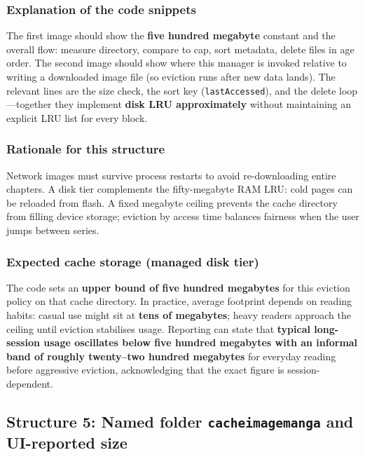 \subsubsection*{Explanation of the code snippets}
The first image should show the \textbf{five hundred megabyte} constant and the overall flow: measure directory, compare to cap, sort metadata, delete files in age order. The second image should show where this manager is invoked relative to writing a downloaded image file (so eviction runs after new data lands). The relevant lines are the size check, the sort key (\texttt{lastAccessed}), and the delete loop---together they implement \textbf{disk LRU approximately} without maintaining an explicit LRU list for every block.

\subsubsection*{Rationale for this structure}
Network images must survive process restarts to avoid re-downloading entire chapters. A disk tier complements the fifty-megabyte RAM LRU: cold pages can be reloaded from flash. A fixed megabyte ceiling prevents the cache directory from filling device storage; eviction by access time balances fairness when the user jumps between series.

\subsubsection*{Expected cache storage (managed disk tier)}
The code sets an \textbf{upper bound of five hundred megabytes} for this eviction policy on that cache directory. In practice, average footprint depends on reading habits: casual use might sit at \textbf{tens of megabytes}; heavy readers approach the ceiling until eviction stabilises usage. Reporting can state that \textbf{typical long-session usage oscillates below five hundred megabytes with an informal band of roughly twenty--two hundred megabytes} for everyday reading before aggressive eviction, acknowledging that the exact figure is session-dependent.


\subsection{Structure 5: Named folder \texttt{cacheimagemanga} and UI-reported size}

